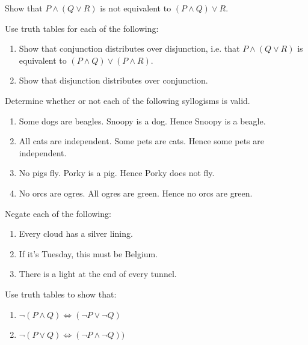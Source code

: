 \begin{exercise}
Show that $P\land(Q\lor R)$ is not equivalent to $(P\land Q)\lor R$.
\end{exercise}

\begin{exercise}\label{exer:dist}
Use truth tables for each of the following:

\begin{enumerate}\itemsep0pt
\item Show that conjunction distributes over disjunction, i.e. that $P\land(Q\lor R)$ is equivalent to $(P\land Q)\lor(P\land R)$.
\item Show that disjunction distributes over conjunction.
\end{enumerate}
\end{exercise}

\begin{exercise}
Determine whether or not each of the following syllogisms is valid.
\begin{enumerate}\itemsep0pt
\item Some dogs are beagles. Snoopy is a dog. Hence Snoopy is a beagle.
\item All cats are independent. Some pets are cats. Hence some pets are independent.
\item  No pigs fly. Porky is a pig. Hence Porky does not fly.
\item  No orcs are ogres. All ogres are green. Hence no orcs are green. 
\end{enumerate}
\end{exercise}

\begin{exercise}
Negate each of the following:
\begin{enumerate}\itemsep0pt
\item Every cloud has a silver lining.
\item If it's Tuesday, this must be Belgium.
\item There is a light at the end of every tunnel.
\end{enumerate}
\end{exercise}

\begin{exercise}\label{exer:DeMorgan}
Use truth tables to show that:
\begin{enumerate}\itemsep0pt
\item $\neg(P\land Q)\Leftrightarrow(\neg P\lor \neg Q)$ 
\item $\neg(P\lor Q)\Leftrightarrow(\neg P\land\neg Q))$
\end{enumerate}
\end{exercise}

